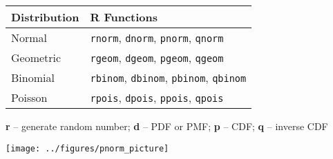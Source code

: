 \begin{center}
\begin{minipage}[t]{0.6\textwidth}
\vspace{0pt} %
\renewcommand{\arraystretch}{1.3}
\begin{tabularx}{\textwidth}{|>{\raggedright\arraybackslash}X|>{\raggedright\arraybackslash}X|}
\hline
\textbf{Distribution} & \textbf{R Functions} \\
\hline
Normal & \texttt{rnorm}, \texttt{dnorm}, \texttt{pnorm}, \texttt{qnorm} \\
\hline
Geometric & \texttt{rgeom}, \texttt{dgeom}, \texttt{pgeom}, \texttt{qgeom} \\
\hline
Binomial & \texttt{rbinom}, \texttt{dbinom}, \texttt{pbinom}, \texttt{qbinom} \\
\hline
Poisson & \texttt{rpois}, \texttt{dpois}, \texttt{ppois}, \texttt{qpois} \\
\hline
\end{tabularx}

\vspace{0.5em}
\textbf{r} -- generate random number; \textbf{d} -- PDF or PMF; \textbf{p} -- CDF; \textbf{q} -- inverse CDF
\end{minipage}%
\hfill
\begin{minipage}[t]{0.4\textwidth}
\vspace{0pt} %
\centering
\texttt{[image: ../figures/pnorm\_picture]}
\end{minipage}
\end{center}
